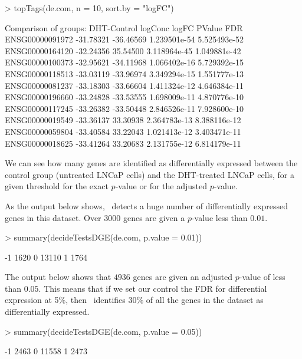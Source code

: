 \begin{Schunk}
\begin{Sinput}
> topTags(de.com, n = 10, sort.by = "logFC")
\end{Sinput}
\begin{Soutput}
Comparison of groups: DHT-Control 
                  logConc     logFC       PValue          FDR
ENSG00000091972 -31.78321 -36.46569 1.239501e-54 5.525493e-52
ENSG00000164120 -32.24356  35.54500 3.118964e-45 1.049881e-42
ENSG00000100373 -32.95621 -34.11968 1.066402e-16 5.729392e-15
ENSG00000118513 -33.03119 -33.96974 3.349294e-15 1.551777e-13
ENSG00000081237 -33.18303 -33.66604 1.411324e-12 4.646384e-11
ENSG00000196660 -33.24828 -33.53555 1.698009e-11 4.870776e-10
ENSG00000117245 -33.26382 -33.50448 2.846526e-11 7.928600e-10
ENSG00000019549 -33.36137  33.30938 2.364783e-13 8.388116e-12
ENSG00000059804 -33.40584  33.22043 1.021413e-12 3.403471e-11
ENSG00000018625 -33.41264  33.20683 2.131755e-12 6.814179e-11
\end{Soutput}
\end{Schunk}

We can see how many genes are identified as differentially expressed
between the control group (untreated LNCaP cells) and the DHT-treated
LNCaP cells, for a given threshold for the exact $p$-value or for the
adjusted $p$-value.

As the output below shows, \edgeR~detects a huge number of
differentially expressed genes in this dataset. Over $3000$ genes
are given a $p$-value less than $0.01$.

\begin{Schunk}
\begin{Sinput}
> summary(decideTestsDGE(de.com, p.value = 0.01))
\end{Sinput}
\begin{Soutput}
   [,1] 
-1  1620
0  13110
1   1764
\end{Soutput}
\end{Schunk}

The output below shows that $4936$ genes are given an adjusted
$p$-value of less than $0.05$. This means that if we set our control
the FDR for differential expression at 5\%, then \edgeR~identifies
$30$\% of all the genes in the dataset as differentially expressed.

\begin{Schunk}
\begin{Sinput}
> summary(decideTestsDGE(de.com, p.value = 0.05))
\end{Sinput}
\begin{Soutput}
   [,1] 
-1  2463
0  11558
1   2473
\end{Soutput}
\end{Schunk}

